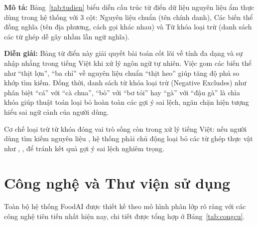 \noindent\textbf{Mô tả:} Bảng~\ref{tab:tudien} biểu diễn cấu trúc từ điển dữ liệu nguyên liệu ẩm thực dùng trong hệ thống với 3 cột: Nguyên liệu chuẩn (tên chính danh), Các biến thể đồng nghĩa (tên địa phương, cách gọi khác nhau) và Từ khóa loại trừ (danh sách các từ ghép dễ gây nhầm lẫn ngữ nghĩa).

\noindent\textbf{Diễn giải:} Bảng từ điển này giải quyết bài toán cốt lõi về tính đa dạng và sự nhập nhằng trong tiếng Việt khi xử lý ngôn ngữ tự nhiên. Việc gom các biến thể như ``thịt lợn'', ``ba chỉ'' về nguyên liệu chuẩn ``thịt heo'' giúp tăng độ phủ so khớp tìm kiếm. Đồng thời, danh sách từ khóa loại trừ (Negative Excludes) như phân biệt ``cá'' với ``cà chua'', ``bò'' với ``bơ tỏi'' hay ``gà'' với ``đậu gà'' là chìa khóa giúp thuật toán loại bỏ hoàn toàn các gợi ý sai lệch, ngăn chặn hiện tượng hiểu sai ngữ cảnh của người dùng.

\begin{luuy}
Cơ chế loại trừ từ khóa  đóng vai trò sống còn trong xử lý tiếng Việt: nếu người dùng tìm kiếm nguyên liệu , hệ thống phải chủ động loại bỏ các từ ghép thực vật như , ,  để tránh kết quả gợi ý sai lệch nghiêm trọng.
\end{luuy}

\section{Công nghệ và Thư viện sử dụng}

Toàn bộ hệ thống FoodAI được thiết kế theo mô hình phân lớp rõ ràng với các công nghệ tiên tiến nhất hiện nay, chi tiết được tổng hợp ở Bảng~\ref{tab:congcu}.

